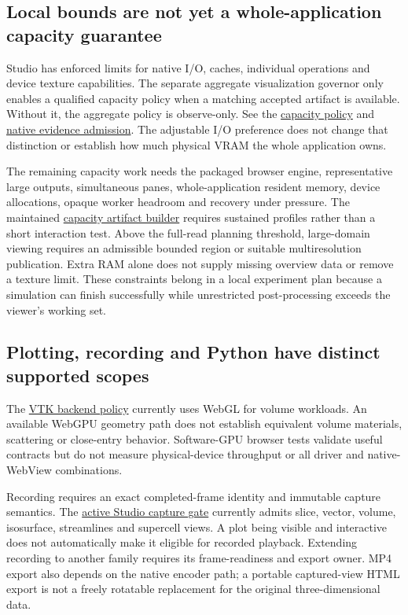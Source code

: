 \subsection{Local bounds are not yet a whole-application capacity guarantee}

Studio has enforced limits for native I/O, caches, individual operations and
device texture capabilities. The separate aggregate visualization governor
only enables a qualified capacity policy when a matching accepted artifact is
available. Without it, the aggregate policy is observe-only. See the
\href{../ui/src/lib/core/visualizationCapacityPolicy.ts}{capacity policy} and
\href{../ui/src-tauri/src/commands/visualization_qualification.rs}{native evidence
admission}. The adjustable I/O preference does not change that distinction or
establish how much physical VRAM the whole application owns.

The remaining capacity work needs the packaged browser engine, representative
large outputs, simultaneous panes, whole-application resident memory, device
allocations, opaque worker headroom and recovery under pressure. The maintained
\href{../tests/ui/release/build_visualization_capacity_qualification.ts}{capacity
artifact builder} requires sustained profiles rather than a short interaction
test. Above the full-read planning threshold, large-domain viewing requires
an admissible bounded region or suitable multiresolution publication. Extra
RAM alone does not supply missing overview data or remove a texture limit.
These constraints belong in a local experiment plan because a simulation can
finish successfully while unrestricted post-processing exceeds the viewer's
working set.

\subsection{Plotting, recording and Python have distinct supported scopes}

The \href{../ui/src/lib/vtk/vtkBackend.ts}{VTK backend policy} currently uses
WebGL for volume workloads. An available WebGPU geometry path does not establish
equivalent volume materials, scattering or close-entry behavior. Software-GPU
browser tests validate useful contracts but do not measure physical-device
throughput or all driver and native-WebView combinations.

Recording requires an exact completed-frame identity and immutable capture
semantics. The \href{../ui/src/components/studio/PlotStudio.tsx}{active Studio
capture gate} currently admits slice, vector, volume, isosurface,
streamlines and supercell views. A plot being visible and interactive does
not automatically make it eligible for recorded playback. Extending recording
to another family requires its frame-readiness and export owner. MP4 export
also depends on the native encoder path; a portable captured-view HTML export
is not a freely rotatable replacement for the original three-dimensional data.

